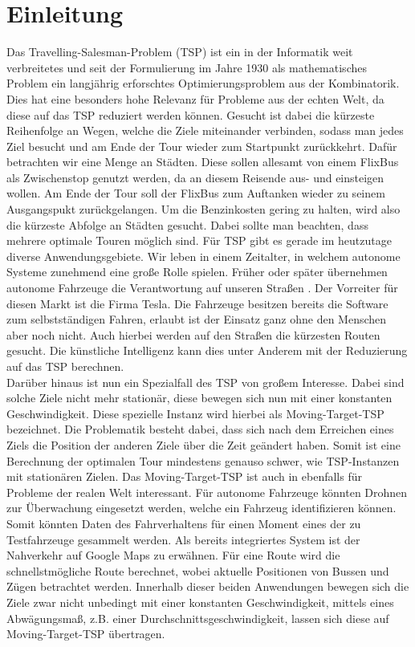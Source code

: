 \documentclass[german,version-2019-11]{uzl-thesis}
\begin{document}
\chapter{Einleitung}

Das Travelling-Salesman-Problem (TSP) ist ein in der Informatik weit verbreitetes und seit der Formulierung im Jahre 1930 als mathematisches Problem ein langjährig erforschtes Optimierungsproblem aus der Kombinatorik. Dies hat eine besonders hohe Relevanz für Probleme aus der echten Welt, da diese auf das TSP reduziert werden können. Gesucht ist dabei die kürzeste Reihenfolge an Wegen, welche die Ziele miteinander verbinden, sodass man jedes Ziel besucht und am Ende der Tour wieder zum Startpunkt zurückkehrt. Dafür betrachten wir eine Menge an Städten. Diese sollen allesamt von einem FlixBus als Zwischenstop genutzt werden, da an diesem Reisende aus- und einsteigen wollen. Am Ende der Tour soll der FlixBus zum Auftanken wieder zu seinem Ausgangspukt zurückgelangen. Um die Benzinkosten gering zu halten, wird also die kürzeste Abfolge an Städten gesucht. Dabei sollte man beachten, dass mehrere optimale Touren möglich sind. Für TSP gibt es gerade im heutzutage diverse Anwendungsgebiete. Wir leben in einem Zeitalter, in welchem autonome Systeme zunehmend eine große Rolle spielen. Früher oder später übernehmen autonome Fahrzeuge die Verantwortung auf unseren Straßen \cite{minx2015autonomes}. Der Vorreiter für diesen Markt ist die Firma Tesla. Die Fahrzeuge besitzen bereits die Software zum selbstständigen Fahren, erlaubt ist der Einsatz ganz ohne den Menschen aber noch nicht. Auch hierbei werden auf den Straßen die kürzesten Routen gesucht. Die künstliche Intelligenz kann dies unter Anderem mit der Reduzierung auf das TSP berechnen. \\
Darüber hinaus ist nun ein Spezialfall des TSP von großem Interesse. Dabei sind solche Ziele nicht mehr stationär, diese bewegen sich nun mit einer konstanten Geschwindigkeit. Diese spezielle Instanz wird hierbei als Moving-Target-TSP bezeichnet. Die Problematik besteht dabei, dass sich nach dem Erreichen eines Ziels die Position der anderen Ziele über die Zeit geändert haben. Somit ist eine Berechnung der optimalen Tour mindestens genauso schwer, wie TSP-Instanzen mit stationären Zielen. Das Moving-Target-TSP ist auch in ebenfalls für Probleme der realen Welt interessant. Für autonome Fahrzeuge könnten Drohnen zur Überwachung eingesetzt werden, welche ein Fahrzeug identifizieren können. Somit könnten Daten des Fahrverhaltens für einen Moment eines der zu Testfahrzeuge gesammelt werden. Als bereits integriertes System ist der Nahverkehr auf Google Maps zu erwähnen. Für eine Route wird die schnellstmögliche Route berechnet, wobei aktuelle Positionen von Bussen und Zügen betrachtet werden. Innerhalb dieser beiden Anwendungen bewegen sich die Ziele zwar nicht unbedingt mit einer konstanten Geschwindigkeit, mittels eines Abwägungsmaß, z.B. einer Durchschnittsgeschwindigkeit, lassen sich diese auf Moving-Target-TSP übertragen. \\
\end{document}
